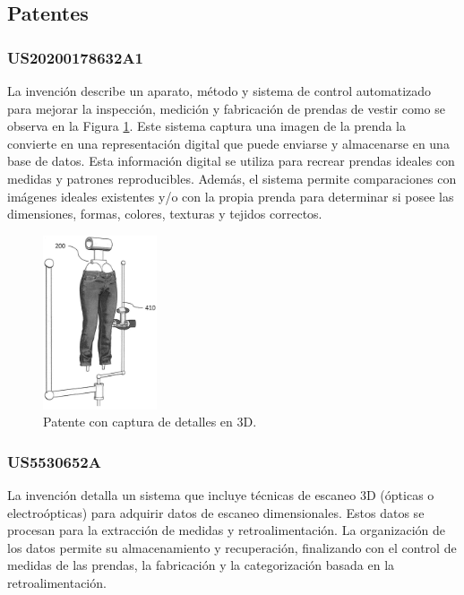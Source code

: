 \subsection{Patentes}

\subsubsection{US20200178632A1}
La invención \cite{us20200178632a1} describe un aparato, método y sistema de control automatizado para mejorar la inspección, medición y fabricación de prendas de vestir como se observa en la Figura \ref{fig:US20200178632A1-20200611-D00005}. Este sistema captura una imagen de la prenda la convierte en una representación digital que puede enviarse y almacenarse en una base de datos. Esta información digital se utiliza para recrear prendas ideales con medidas y patrones reproducibles. Además, el sistema permite comparaciones con imágenes ideales existentes y/o con la propia prenda para determinar si posee las dimensiones, formas, colores, texturas y tejidos correctos.

\begin{figure}[H]
    \centering
    \includegraphics[width=0.3\textwidth]{img/US20200178632A1-20200611-D00005.png}
    \caption{Patente con captura de detalles en 3D.}
    \label{fig:US20200178632A1-20200611-D00005}
\end{figure}

\subsubsection{US5530652A}

La invención \cite{US5530652A} detalla un sistema que incluye técnicas de escaneo 3D (ópticas o electroópticas) para adquirir datos de escaneo dimensionales. Estos datos se procesan para la extracción de medidas y retroalimentación. La organización de los datos permite su almacenamiento y recuperación, finalizando con el control de medidas de las prendas, la fabricación y la categorización basada en la retroalimentación.

